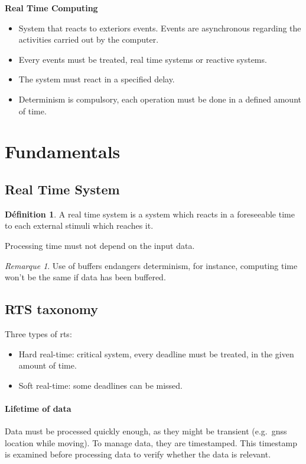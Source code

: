 \documentclass[10pt]{article}
\theoremstyle{plain}
\theoremstyle{definition}
\newtheorem{defn}{Définition}
\theoremstyle{remark}
\newtheorem{rem}{Remarque}
\begin{document}
\begin{center}
    \Large\textbf{Real Time Computing}
\end{center}
\begin{itemize}
    \item System that reacts to exteriors events. Events are
        asynchronous regarding the activities carried out by the computer.
    \item Every events must be treated, real time systems or reactive systems.
    \item The system must react in a specified delay.
    \item Determinism is compulsory, each operation must be done in a defined
        amount of time.
\end{itemize}

\section{Fundamentals}
\subsection{Real Time System}
\begin{defn}
    A real time system is a system which reacts in a foreseeable time to each
    external stimuli which reaches it.

    Processing time must not depend on the input data.
\end{defn}
\begin{rem}
    Use of buffers endangers determinism, for instance, computing time won't be
    the same if data has been buffered.
\end{rem}

\subsection{RTS taxonomy}
Three types of rts:
\begin{itemize}
    \item Hard real-time: critical system, every deadline must be treated, in 
        the given amount of time.
    \item Soft real-time: some deadlines can be missed.
\end{itemize}

\paragraph{Lifetime of data}
Data must be processed quickly enough, as they might be transient (e.g.\ gnss
location while moving). To manage data, they are timestamped. This timestamp is
examined before processing data to verify whether the data is relevant.
\end{document}
